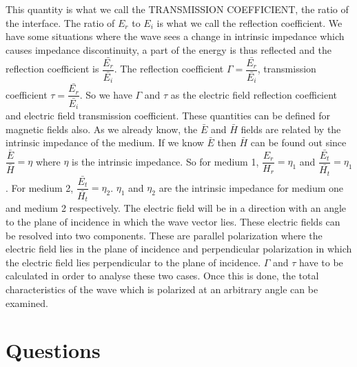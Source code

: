 This quantity is what we call the TRANSMISSION COEFFICIENT, the ratio of the interface. The ratio of $ E_r$ to $E_i$ is what we call the reflection coefficient. We have some situations where the wave sees a change in intrinsic impedance which causes impedance discontinuity, a part of the energy is thus reflected and the reflection coefficient is $\dfrac{\bar{E_r}}{\bar{E_i}}$. The reflection coefficient $\Gamma=\dfrac{\bar{E_r}}{\bar{E_i}}$, transmission coefficient $\tau=\dfrac{\bar{E_r}}{\bar{E_i}}$. So we have $\Gamma$ and $\tau$ as the electric field reflection coefficient and electric field transmission coefficient. These quantities can be defined for magnetic fields also. As we already know, the $\bar{E}$ and $\bar{ H}$ fields are related by the intrinsic impedance of the medium. If we know $\bar{E}$ then $\bar{H}$ can be found out since $\dfrac{\bar{E}}{\bar{H}}=\eta$ where $\eta$ is the intrinsic impedance. So for medium 1,  $\dfrac{E_r}{H_r}=\eta_1$  and $\dfrac{\bar{E_t}}{\bar{H_t}}=\eta_1$. For medium 2, $\dfrac{\bar{E_t}}{\bar{H_t}}=\eta_2$. $\eta_1$ and $\eta_2$ are the intrinsic impedance for medium one and medium 2 respectively. The electric field will be in a direction with an angle to the plane of incidence in which the wave vector lies. These electric fields can be resolved into two components. These are parallel polarization where the electric field lies in the plane of incidence and perpendicular polarization in which the electric field lies perpendicular to the plane of incidence. $\Gamma$ and $\tau$ have to be calculated in order to analyse these two cases. Once this is done, the total characteristics of the wave which is polarized at an arbitrary angle can be examined.

\section*{Questions}

